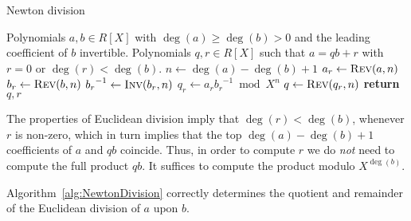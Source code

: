 \begin{algorithm}[H]
\caption{Newton division}
\label{alg:NewtonDivision}
\begin{algorithmic}
\vspace{1mm}
\Require Polynomials $a, b \in R[X]$ with $\deg(a) \geq \deg(b) > 0$ 
         and the leading coefficient of $b$ invertible.
\Ensure  Polynomials $q, r \in R[X]$ such that $a = qb + r$ with $r = 0$ 
         or $\deg(r) < \deg(b)$.
\State  $n \gets \deg(a) - \deg(b) + 1$
\State  $a_r \gets \Call{Rev}{a,n}$
\State  $b_r \gets \Call{Rev}{b,n}$
\State  ${b_r}^{-1} \gets \Call{Inv}{b_r,n}$
\State  $q_r \gets a_r {b_r}^{-1} \bmod X^n$
\State  $q \gets \Call{Rev}{q_r, n}$
\State \textbf{return} $q, r$
\EndProcedure
\end{algorithmic}
\end{algorithm}

\begin{rem}
The properties of Euclidean division imply that $\deg(r) < \deg(b)$, 
whenever $r$ is non-zero, which in turn implies that the top 
$\deg(a) - \deg(b) + 1$ coefficients of $a$ and $q b$ 
coincide.  Thus, in order to compute $r$ we do \emph{not} 
need to compute the full product $q b$.  It suffices to 
compute the product modulo $X^{\deg(b)}$.
\end{rem}

\begin{thm}
Algorithm~\ref{alg:NewtonDivision} correctly determines 
the quotient and remainder of the Euclidean division of 
$a$ upon $b$.
\end{thm}

